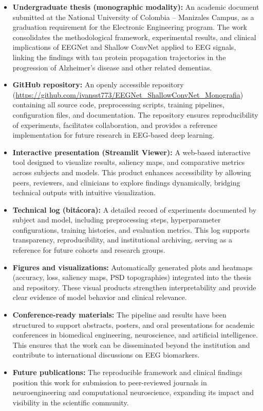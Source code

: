 \documentclass[12pt,a4paper]{article}
\begin{document}
\begin{itemize}
    \item \textbf{Undergraduate thesis (monographic modality):} An academic document submitted at the National University of Colombia – Manizales Campus, as a graduation requirement for the Electronic Engineering program. The work consolidates the methodological framework, experimental results, and clinical implications of EEGNet and Shallow ConvNet applied to EEG signals, linking the findings with tau protein propagation trajectories in the progression of Alzheimer’s disease and other related dementias.
    
    \item \textbf{GitHub repository:} An openly accessible repository (\url{https://github.com/ivansst773/EEGNet_ShallowConvNet_Monografia}) containing all source code, preprocessing scripts, training pipelines, configuration files, and documentation. The repository ensures reproducibility of experiments, facilitates collaboration, and provides a reference implementation for future research in EEG-based deep learning.
    
    \item \textbf{Interactive presentation (Streamlit Viewer):} A web-based interactive tool designed to visualize results, saliency maps, and comparative metrics across subjects and models. This product enhances accessibility by allowing peers, reviewers, and clinicians to explore findings dynamically, bridging technical outputs with intuitive visualization.
    
    \item \textbf{Technical log (bitácora):} A detailed record of experiments documented by subject and model, including preprocessing steps, hyperparameter configurations, training histories, and evaluation metrics. This log supports transparency, reproducibility, and institutional archiving, serving as a reference for future cohorts and research groups.
    
    \item \textbf{Figures and visualizations:} Automatically generated plots and heatmaps (accuracy, loss, saliency maps, PSD topographies) integrated into the thesis and repository. These visual products strengthen interpretability and provide clear evidence of model behavior and clinical relevance.
    
    \item \textbf{Conference-ready materials:} The pipeline and results have been structured to support abstracts, posters, and oral presentations for academic conferences in biomedical engineering, neuroscience, and artificial intelligence. This ensures that the work can be disseminated beyond the institution and contribute to international discussions on EEG biomarkers.
    
    \item \textbf{Future publications:} The reproducible framework and clinical findings position this work for submission to peer-reviewed journals in neuroengineering and computational neuroscience, expanding its impact and visibility in the scientific community.
\end{itemize}
\end{document}
